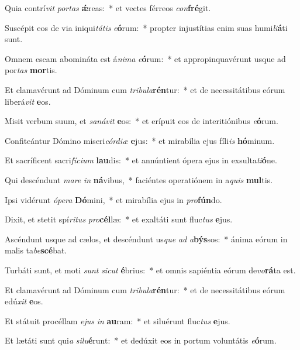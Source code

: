 \item Quia contrí\textit{vit} \textit{por}\textit{tas} \textbf{ǽ}reas:~* et vectes férreos \textit{con}\textbf{fré}git.
\item Suscépit eos de via iniqui\textit{tá}\textit{tis} \textit{e}\textbf{ó}rum:~* propter injustítias enim suas humi\textit{li}\textbf{á}ti sunt.
\item Omnem escam abomináta est á\textit{ni}\textit{ma} \textit{e}\textbf{ó}rum:~* et appropinquavérunt usque ad por\textit{tas} \textbf{mor}tis.
\item Et clamavérunt ad Dóminum cum \textit{tri}\textit{bu}\textit{la}\textbf{rén}tur:~* et de necessitátibus eórum liberá\textit{vit} \textbf{e}os.
\item Misit verbum suum, et \textit{sa}\textit{ná}\textit{vit} \textbf{e}os:~* et erípuit eos de interitiónibus \textit{e}\textbf{ó}rum.
\item Confiteántur Dómino miseri\textit{cór}\textit{di}\textit{æ} \textbf{e}jus:~* et mirabília ejus fíli\textit{is} \textbf{hó}minum.
\item Et sacríficent sacri\textit{fí}\textit{ci}\textit{um} \textbf{lau}dis:~* et annúntient ópera ejus in exsulta\textit{ti}\textbf{ó}ne.
\item Qui descéndunt \textit{ma}\textit{re} \textit{in} \textbf{ná}vibus,~* faciéntes operatiónem in a\textit{quis} \textbf{mul}tis.
\item Ipsi vidérunt \textit{ó}\textit{pe}\textit{ra} \textbf{Dó}mini,~* et mirabília ejus in \textit{pro}\textbf{fún}do.
\item Dixit, et stetit spí\textit{ri}\textit{tus} \textit{pro}\textbf{cél}læ:~* et exaltáti sunt fluc\textit{tus} \textbf{e}jus.
\item Ascéndunt usque ad cælos, et descéndunt us\textit{que} \textit{ad} \textit{a}\textbf{býs}sos:~* ánima eórum in malis ta\textit{be}\textbf{scé}bat.
\item Turbáti sunt, et moti \textit{sunt} \textit{sic}\textit{ut} \textbf{é}brius:~* et omnis sapiéntia eórum de\textit{vo}\textbf{rá}ta est.
\item Et clamavérunt ad Dóminum cum \textit{tri}\textit{bu}\textit{la}\textbf{rén}tur:~* et de necessitátibus eórum edú\textit{xit} \textbf{e}os.
\item Et státuit procéllam \textit{e}\textit{jus} \textit{in} \textbf{au}ram:~* et siluérunt fluc\textit{tus} \textbf{e}jus.
\item Et lætáti sunt qui\textit{a} \textit{si}\textit{lu}\textbf{é}runt:~* et dedúxit eos in portum voluntátis \textit{e}\textbf{ó}rum.
